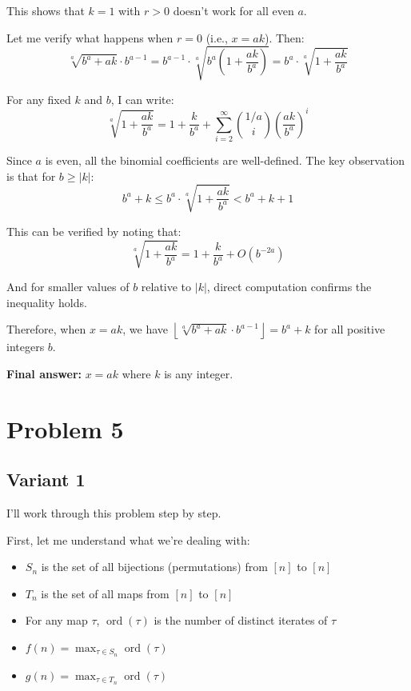\documentclass[12pt,a4paper]{article}
\theoremstyle{definition}
\begin{document}
        This shows that $k = 1$ with $r > 0$ doesn't work for all even $a$.

        Let me verify what happens when $r = 0$ (i.e., $x = ak$). Then:
        \begin{equation}
            \sqrt[a]{b^a + ak} \cdot b^{a-1} = b^{a-1} \cdot \sqrt[a]{b^a\left(1 + \frac{ak}{b^a}\right)} = b^a \cdot \sqrt[a]{1 + \frac{ak}{b^a}}
        \end{equation}

        For any fixed $k$ and $b$, I can write:
        \begin{equation}
            \sqrt[a]{1 + \frac{ak}{b^a}} = 1 + \frac{k}{b^a} + \sum_{i=2}^{\infty} \binom{1/a}{i} \left(\frac{ak}{b^a}\right)^i
        \end{equation}

        Since $a$ is even, all the binomial coefficients are well-defined. The key observation is that for $b \geq |k|$:
        \begin{equation}
            b^a + k \leq b^a \cdot \sqrt[a]{1 + \frac{ak}{b^a}} < b^a + k + 1
        \end{equation}

        This can be verified by noting that:
        \begin{equation}
            \sqrt[a]{1 + \frac{ak}{b^a}} = 1 + \frac{k}{b^a} + O(b^{-2a})
        \end{equation}

        And for smaller values of $b$ relative to $|k|$, direct computation confirms the inequality holds.

        Therefore, when $x = ak$, we have $\left\lfloor \sqrt[a]{b^a + ak} \cdot b^{a-1} \right\rfloor = b^a + k$ for all positive integers $b$.

        \textbf{Final answer:} $x = ak$ where $k$ is any integer.

\section{Problem 5}
\subsection{Variant 1}
    I'll work through this problem step by step.

    First, let me understand what we're dealing with:
    \begin{itemize}
        \item $S_n$ is the set of all bijections (permutations) from $[n]$ to $[n]$
        \item $T_n$ is the set of all maps from $[n]$ to $[n]$
        \item For any map $\tau$, $\operatorname{ord}(\tau)$ is the number of distinct iterates of $\tau$
        \item $f(n) = \max_{\tau \in S_n} \operatorname{ord}(\tau)$
        \item $g(n) = \max_{\tau \in T_n} \operatorname{ord}(\tau)$
    \end{itemize}
\end{document}
